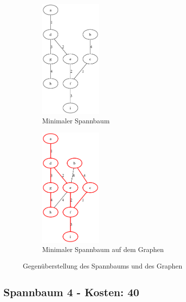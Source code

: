 \documentclass[a4paper,11pt]{report}
\begin{document}
    \begin{figure}[htbp]
        \centering
        \begin{subfigure}[b]{0.45\textwidth}
            \centering
            \includegraphics[width=\textwidth, height=6cm, keepaspectratio]{a03a_mst_3}
            \caption{Minimaler Spannbaum}
            \label{fig:a03_mst_03}
        \end{subfigure}
        \begin{subfigure}[b]{0.45\textwidth}
            \centering
            \includegraphics[width=\textwidth, height=6cm, keepaspectratio]{a03a_mst_3_highlighted}
            \caption{Minimaler Spannbaum auf dem Graphen}
            \label{fig:a03_mst_03_highlighted}
        \end{subfigure}
        \caption{Gegenüberstellung des Spannbaums und des Graphen}
        \label{fig:a03_03}
    \end{figure}
    \FloatBarrier

    \subsection{Spannbaum 4 - Kosten: 40}\label{subsec:spannbaum-4---kosten:-40}
\end{document}
